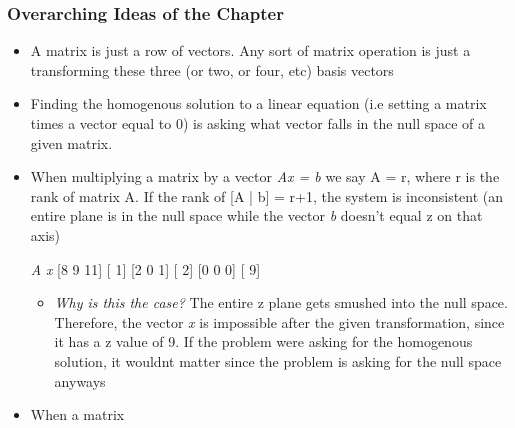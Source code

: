 \documentclass[11pt]{article}
\begin{document}
\subsubsection{Overarching Ideas of the Chapter}
\label{sec:org28d4122}
\begin{itemize}
\item A matrix is just a row of vectors. Any sort of matrix operation is just a transforming these three (or two, or four, etc) basis vectors
\item Finding the homogenous solution to a linear equation (i.e setting a matrix times a vector equal to 0) is asking what vector falls in the null space of a given matrix.
\item When multiplying a matrix by a vector \emph{Ax = b} we say A = r, where r is the rank of matrix A. If the rank of [A | b] = r+1, the system is inconsistent (an entire plane is in the null space while the vector \emph{b} doesn't equal z on that axis)

   \emph{A}     \emph{x}
{[}8 9 11] [ 1]
{[}2 0 1] [ 2]
{[}0 0 0] [ 9]

\begin{itemize}
\item \emph{Why is this the case?} The entire z plane gets smushed into the null space. Therefore, the vector \emph{x} is impossible after the given transformation, since it has a z value of 9. If the problem were asking for the homogenous solution, it wouldnt matter since the problem is asking for the null space anyways
\end{itemize}

\item When a matrix
\end{itemize}
\end{document}
